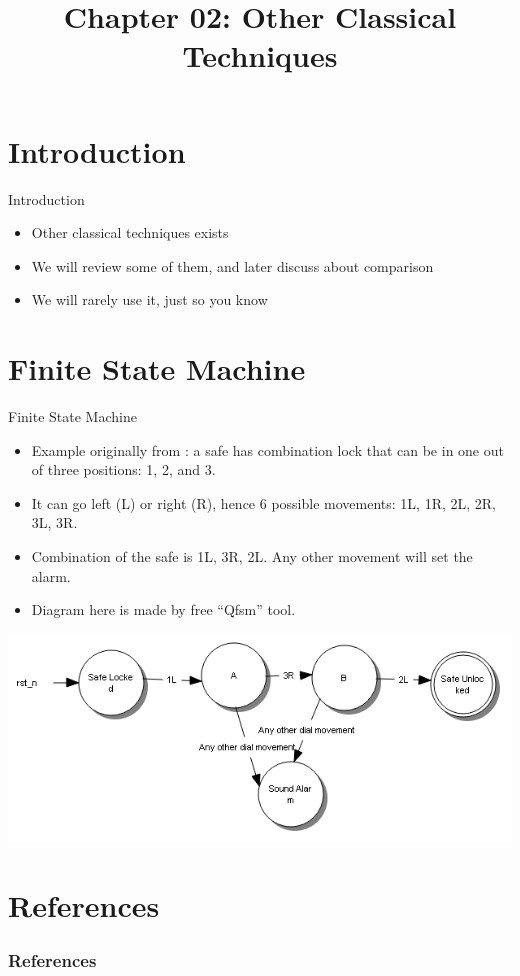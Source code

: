 \documentclass{beamer}
\title{Chapter 02: Other Classical Techniques}
\begin{document}
	\begin{frame}
		\titlepage
	\end{frame}

	\section{Introduction}
	\begin{frame}{Introduction}
		\begin{itemize}
		    \item Other classical techniques exists
		    \item We will review some of them, and later discuss about comparison
		    \item We will rarely use it, just so you know
		\end{itemize}
	\end{frame}
	
	\section{Finite State Machine}
	\begin{frame}{Finite State Machine}
    	\begin{itemize}
    	    \item Example originally from \cite{brady1977theory}: a safe has combination lock that can be in one out of three positions: 1, 2, and 3.
    	    \item It can go left (L) or right (R), hence 6 possible movements: 1L, 1R, 2L, 2R, 3L, 3R.
    	    \item Combination of the safe is 1L, 3R, 2L. Any other movement will set the alarm.
    	    \item Diagram here is made by free ``Qfsm'' tool.
	    \end{itemize}
	    \includegraphics[scale=0.5]{img/03_safe_fsm.png}
	\end{frame}
	
	\section{References}
	\begin{frame}[allowframebreaks]
        \frametitle{References}
        
        
	\end{frame}	
\end{document}
